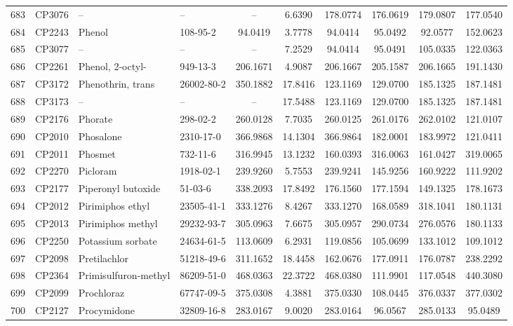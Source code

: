 \begin{longtable}{clllcccccc}
683 & CP3076 & – & – & – & 6.6390 & 178.0774 & 176.0619 & 179.0807 & 177.0540 \\ 
684 & CP2243 & Phenol\smash{\textsuperscript{\textdagger}} & 108-95-2 & 94.0419 & 3.7778 & 94.0414 & 95.0492 & 92.0577 & 152.0623 \\ 
685 & CP3077 & – & – & – & 7.2529 & 94.0414 & 95.0491 & 105.0335 & 122.0363 \\ 
686 & CP2261 & Phenol, 2-octyl- & 949-13-3 & 206.1671 & 4.9087 & 206.1667 & 205.1587 & 206.1665 & 191.1430 \\ 
687 & CP3172 & Phenothrin, trans & 26002-80-2 & 350.1882 & 17.8416 & 123.1169 & 129.0700 & 185.1325 & 187.1481 \\ 
688 & CP3173 & – & – & – & 17.5488 & 123.1169 & 129.0700 & 185.1325 & 187.1481 \\ 
689 & CP2176 & Phorate & 298-02-2 & 260.0128 & 7.7035 & 260.0125 & 261.0176 & 262.0102 & 121.0107 \\ 
690 & CP2010 & Phosalone & 2310-17-0 & 366.9868 & 14.1304 & 366.9864 & 182.0001 & 183.9972 & 121.0411 \\ 
691 & CP2011 & Phosmet & 732-11-6 & 316.9945 & 13.1232 & 160.0393 & 316.0063 & 161.0427 & 319.0065 \\ 
692 & CP2270 & Picloram & 1918-02-1 & 239.9260 & 5.7553 & 239.9241 & 145.9256 & 160.9222 & 111.9202 \\ 
693 & CP2177 & Piperonyl butoxide & 51-03-6 & 338.2093 & 17.8492 & 176.1560 & 177.1594 & 149.1325 & 178.1673 \\ 
694 & CP2012 & Pirimiphos ethyl & 23505-41-1 & 333.1276 & 8.4267 & 333.1270 & 168.0589 & 318.1041 & 180.1131 \\ 
695 & CP2013 & Pirimiphos methyl & 29232-93-7 & 305.0963 & 7.6675 & 305.0957 & 290.0734 & 276.0576 & 180.1133 \\ 
696 & CP2250 & Potassium sorbate & 24634-61-5 & 113.0609 & 6.2931 & 119.0856 & 105.0699 & 133.1012 & 109.1012 \\ 
697 & CP2098 & Pretilachlor & 51218-49-6 & 311.1652 & 18.4458 & 162.0676 & 177.0911 & 176.0787 & 238.2292 \\ 
698 & CP2364 & Primisulfuron-methyl & 86209-51-0 & 468.0363 & 22.3722 & 468.0380 & 111.9901 & 117.0548 & 440.3080 \\ 
699 & CP2099 & Prochloraz & 67747-09-5 & 375.0308 & 4.3881 & 375.0330 & 108.0445 & 376.0337 & 377.0302 \\ 
700 & CP2127 & Procymidone & 32809-16-8 & 283.0167 & 9.0020 & 283.0164 & 96.0567 & 285.0133 & 95.0489 \\ 

\end{longtable}
